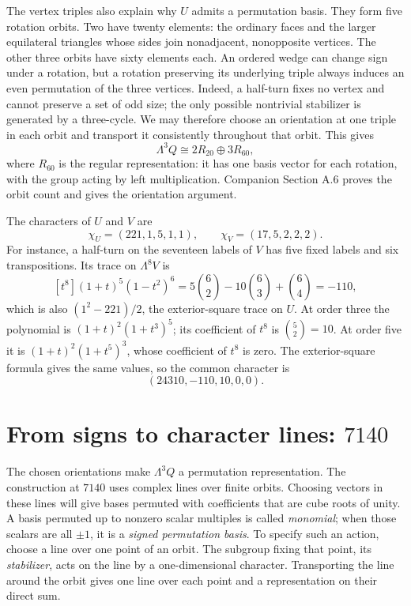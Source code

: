 \documentclass[11pt,a4paper]{article}
\begin{document}
The vertex triples also explain why $U$ admits a permutation basis.
They form five rotation orbits. Two have twenty elements: the ordinary
faces and the larger equilateral triangles whose sides join nonadjacent,
nonopposite vertices. The other three orbits have sixty elements each.
An ordered wedge can change sign under a rotation, but a rotation
preserving its underlying triple always induces an even permutation of the three vertices. Indeed, a half-turn fixes no vertex and cannot preserve a set
of odd size; the only possible nontrivial stabilizer is generated by a
three-cycle. We may therefore choose an orientation at one triple in
each orbit and transport it consistently throughout that orbit. This
gives
\[
\Lambda^3Q\cong2R_{20}\oplus3R_{60},
\]
where $R_{60}$ is the regular representation: it has one basis vector for
each rotation, with the group acting by left multiplication.
Companion Section A.6 proves the orbit count and gives the orientation argument.

The characters of $U$ and $V$ are
\[
\chi_U=(221,1,5,1,1),\qquad \chi_V=(17,5,2,2,2).
\]
For instance, a half-turn on the seventeen labels of $V$ has five fixed
labels and six transpositions. Its trace on $\Lambda^8V$ is
\[
[t^8](1+t)^5(1-t^2)^6
=5\binom62-10\binom63+\binom64=-110,
\]
which is also $(1^2-221)/2$, the exterior-square trace on $U$.
At order three the polynomial is $(1+t)^2(1+t^3)^5$; its coefficient
of $t^8$ is $\binom52=10$. At order five it is
$(1+t)^2(1+t^5)^3$, whose coefficient of $t^8$ is zero.
The exterior-square formula gives the same values, so the common character is
\[
(24310,-110,10,0,0).
\]

\section[From signs to character lines: 7140]{From signs to character lines: $7140$}\label{sec:character-lines}

The chosen orientations make $\Lambda^3Q$ a permutation representation. The construction at $7140$ uses complex lines over
finite orbits. Choosing vectors in these lines will give bases permuted
with coefficients that are cube roots of unity. A basis permuted up to
nonzero scalar multiples is called \emph{monomial}; when those scalars
are all $\pm1$, it is a \emph{signed permutation basis}.
To specify such an action, choose a line over one point of an orbit. The
subgroup fixing that point, its \emph{stabilizer}, acts on the line by a
one-dimensional character. Transporting the line around the orbit gives
one line over each point and a representation on their direct sum.
\end{document}
